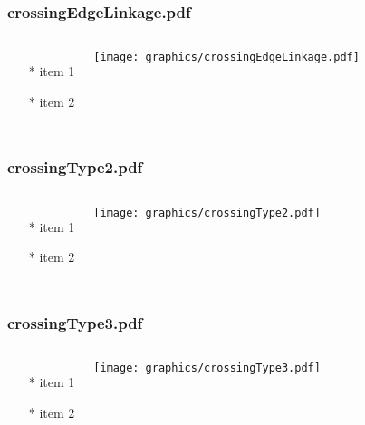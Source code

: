 \documentclass{beamer}
\begin{document}
\begin{frame} \frametitle{crossingEdgeLinkage.pdf}
    \begin{columns}[c]
        \begin{itemize}
            \item[*] item 1
            \item[*] item 2
        \end{itemize}
        \begin{minipage}{\linewidth}
            \begin{center}
            \texttt{[image: graphics/crossingEdgeLinkage.pdf]}
            \label{gfx:crossingEdgeLinkage.pdf}
            \end{center}
        \end{minipage}
    \end{columns}
\end{frame}
\begin{frame} \frametitle{crossingType2.pdf}
    \begin{columns}[c]
        \begin{itemize}
            \item[*] item 1
            \item[*] item 2
        \end{itemize}
        \begin{minipage}{\linewidth}
            \begin{center}
            \texttt{[image: graphics/crossingType2.pdf]}
            \label{gfx:crossingType2.pdf}
            \end{center}
        \end{minipage}
    \end{columns}
\end{frame}
\begin{frame} \frametitle{crossingType3.pdf}
    \begin{columns}[c]
        \begin{itemize}
            \item[*] item 1
            \item[*] item 2
        \end{itemize}
        \begin{minipage}{\linewidth}
            \begin{center}
            \texttt{[image: graphics/crossingType3.pdf]}
            \label{gfx:crossingType3.pdf}
            \end{center}
        \end{minipage}
    \end{columns}
\end{frame}
\end{document}
